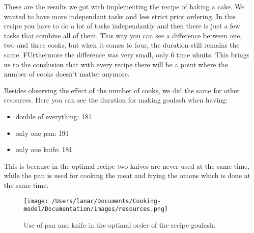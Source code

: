 These are the results we got with implementing the recipe of baking a cake. We wanted to have more independant tasks and less strict prior ordering. 
In this recipe you have to do a lot of tasks independantly and then there is just a few tasks that combine all of them. This way you can see a difference 
between one, two and three cooks, but when it comes to four, the duration still remains the same. FUrthermore the difference was very small, only 6 time uhnits. This brings us to the conslusion that with every recipe 
there will be a point where the number of cooks doesn't matter anymore. 


Besides observing the effect of the number of cooks, we did the same for other resources. Here you can see the duration for making goulash when having:
\begin{itemize}
    \item double of everything: 181
    \item only one pan: 191
    \item only one knife: 181
\end{itemize}

This is because in the optimal recipe two knives are never used at the same time, while the pan is used for cooking the meat and frying the onions which is done at the same time. 

\begin{figure}[H]
    \centerline{\texttt{[image: /Users/lanar/Documents/Cooking-model/Documentation/images/resources.png]}}
    \caption{Use of pan and knife in the optimal order of the recipe goulash.}
    \label{fig9}
\end{figure}
